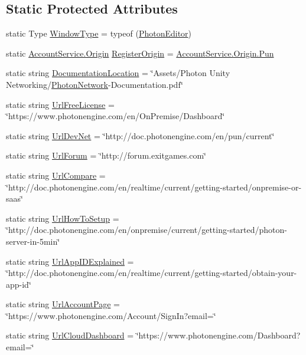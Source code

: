 \subsection*{Static Protected Attributes}
\begin{DoxyCompactItemize}
\item 
static Type \hyperlink{class_photon_editor_a4d9c4354d88e679b621ff016702c44c7}{Window\+Type} = typeof (\hyperlink{class_photon_editor}{Photon\+Editor})
\item 
static \hyperlink{class_account_service_ad255ee623b704af8d6995bd2a6eca292}{Account\+Service.\+Origin} \hyperlink{class_photon_editor_a4882839f9ba412f6eeefa90eb4d190e3}{Register\+Origin} = \hyperlink{class_account_service_ad255ee623b704af8d6995bd2a6eca292a6644a7352d32c9c4443017798130b61f}{Account\+Service.\+Origin.\+Pun}
\item 
static string \hyperlink{class_photon_editor_adf8ddba59d3bddf3e49b891d472b9dd2}{Documentation\+Location} = \char`\"{}Assets/Photon Unity Networking/\hyperlink{class_photon_network}{Photon\+Network}-\/Documentation.\+pdf\char`\"{}
\item 
static string \hyperlink{class_photon_editor_a93dc60253b81669da6cb308d2231d051}{Url\+Free\+License} = \char`\"{}https\+://www.\+photonengine.\+com/en/On\+Premise/Dashboard\char`\"{}
\item 
static string \hyperlink{class_photon_editor_abdf6a9fa996d1f5d8ada5a4bc234a3b9}{Url\+Dev\+Net} = \char`\"{}http\+://doc.\+photonengine.\+com/en/pun/current\char`\"{}
\item 
static string \hyperlink{class_photon_editor_afcb7450394c6278d2599f1b9115cc902}{Url\+Forum} = \char`\"{}http\+://forum.\+exitgames.\+com\char`\"{}
\item 
static string \hyperlink{class_photon_editor_a6c16a7bf3978e7afaf4ca8ffbe12ce8b}{Url\+Compare} = \char`\"{}http\+://doc.\+photonengine.\+com/en/realtime/current/getting-\/started/onpremise-\/or-\/saas\char`\"{}
\item 
static string \hyperlink{class_photon_editor_aa0d6b2dd69b2acbb818483ef4c07d1b5}{Url\+How\+To\+Setup} = \char`\"{}http\+://doc.\+photonengine.\+com/en/onpremise/current/getting-\/started/photon-\/server-\/in-\/5min\char`\"{}
\item 
static string \hyperlink{class_photon_editor_a684e57a183bbf8bbbe2bf9ea7520d8d2}{Url\+App\+I\+D\+Explained} = \char`\"{}http\+://doc.\+photonengine.\+com/en/realtime/current/getting-\/started/obtain-\/your-\/app-\/id\char`\"{}
\item 
static string \hyperlink{class_photon_editor_a8fd6815b3b00bbc9aa02db0d68b78008}{Url\+Account\+Page} = \char`\"{}https\+://www.\+photonengine.\+com/Account/Sign\+In?email=\char`\"{}
\item 
static string \hyperlink{class_photon_editor_a9914d20ee113bbc862c10076770f68bf}{Url\+Cloud\+Dashboard} = \char`\"{}https\+://www.\+photonengine.\+com/Dashboard?email=\char`\"{}
\end{DoxyCompactItemize}


